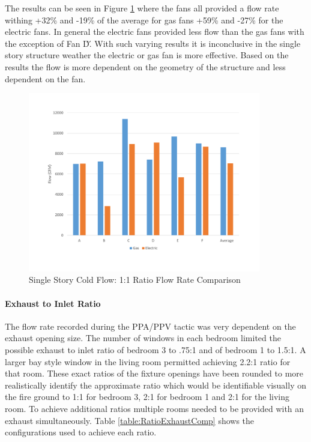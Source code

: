 \documentclass{article}
\begin{document}
The results can be seen in Figure \ref{fig:1_1RatioSingleStory} where the fans all provided a flow rate withing +32\% and -19\% of the average for gas fans +59\% and -27\% for the electric fans. In general the electric fans provided less flow than the gas fans with the exception of Fan \'D\'. With such varying results it is inconclusive in the single story structure weather the electric or gas fan is more effective. Based on the results the flow is more dependent on the geometry of the structure and less dependent on the fan. 

\begin{figure}[H]
	\centering
	\includegraphics[width=4in]{0_Images/ColdFlow/Single_Story/1_1_Ratio.pdf}
	\caption{Single Story Cold Flow: 1:1 Ratio Flow Rate Comparison}
	\label{fig:1_1RatioSingleStory}
\end{figure}

\paragraph{Exhaust to Inlet Ratio} \mbox{}

The flow rate recorded during the PPA/PPV tactic was very dependent on the exhaust opening size. The number of windows in each bedroom limited the possible exhaust to inlet ratio of bedroom 3 to .75:1 and of bedroom 1 to 1.5:1.  A larger bay style window in the living room permitted achieving 2.2:1 ratio for that room. These exact ratios of the fixture openings have been rounded to more realistically identify the approximate ratio which would be identifiable visually on the fire ground to 1:1 for bedroom 3, 2:1 for bedroom 1 and 2:1 for the living room. To achieve additional ratios multiple rooms needed to be provided with an exhaust simultaneously. Table \ref{table:RatioExhaustComp} shows the configurations used to achieve each ratio.
\end{document}
